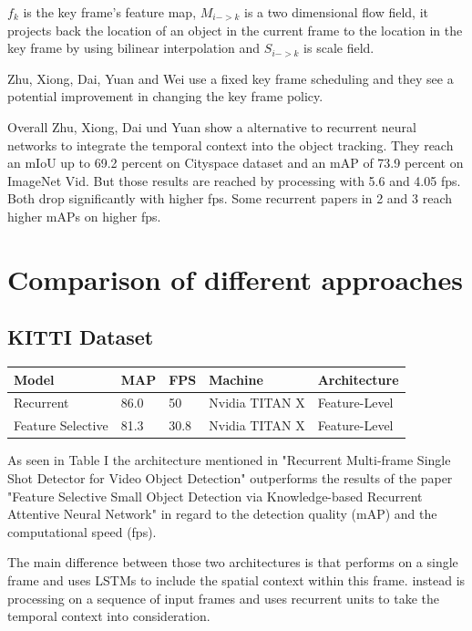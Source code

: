 \documentclass[conference]{IEEEtran}
\begin{document}
$ f_{k} $ is the key frame's feature map, $ M_{i->k} $ is a two dimensional flow field, it projects back the location of an object in the current frame to the location in the key frame by using bilinear interpolation and  $ S_{i->k} $ is scale field. \newline

Zhu, Xiong, Dai, Yuan and Wei use a fixed key frame scheduling and they  see a potential improvement in changing the key frame policy. \newline

Overall Zhu, Xiong, Dai und Yuan show  a alternative  to recurrent neural networks to integrate the temporal context into the object tracking. They reach an mIoU up to 69.2 percent on Cityspace dataset and an mAP of 73.9 percent on ImageNet Vid. But those results are reached by processing with 5.6 and 4.05 fps. Both drop significantly with higher fps. Some recurrent papers in 2 and 3 reach higher mAPs on higher fps. 

\section{Comparison of different approaches}

\subsection{KITTI Dataset}
\begin{tabular}{ | p{2cm} | p{2em}| p{2em} | p{4em} | p{5em} | } 
 \hline
 Model & MAP & FPS & Machine & Architecture \\
 \hline
 Recurrent \cite{b1} & 86.0 & 50 & Nvidia TITAN X & Feature-Level \\
 \hline
 Feature Selective \cite{b6} & 81.3 & 30.8 & Nvidia TITAN X & Feature-Level \\
 \hline
\end{tabular} \newline

As seen in Table I the architecture mentioned in "Recurrent Multi-frame Single Shot Detector for Video Object Detection" \cite{b1} outperforms the results of the paper "Feature Selective Small Object Detection via Knowledge-based Recurrent Attentive Neural Network" \cite{b6} in regard to the detection quality (mAP) and the computational speed (fps). \newline

The main difference between those two architectures is that \cite{b6} performs on a single frame and uses LSTMs to include the spatial context within this frame. \cite{b1} instead is processing on a sequence of input frames and uses recurrent units to take the temporal context into consideration. \newline
\end{document}
